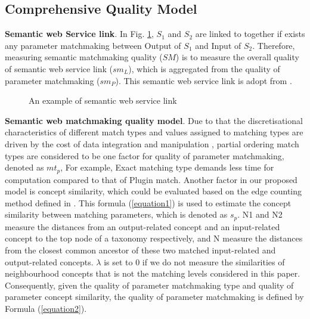 \documentclass{llncs}
\begin{document}
\subsection{Comprehensive Quality Model}\label{qualityModel}

\textbf{Semantic web Service link}. In Fig. \ref{semanticLink}, $S_{1}$ and $S_{2}$ are linked to together if exists any parameter matchmaking between  Output of $S_1$ and Input of $S_2$.  Therefore, measuring semantic matchmaking quality ($SM$) is to measure the overall quality of semantic web service link ($sm_{L}$), which is aggregated from the quality of parameter matchmaking ($sm_{P}$). This semantic web service link is adopt from \cite{lecue2009optimizing}.

\begin{figure}[h]
\centering
{}
 \caption{ An example of semantic web service link}
 \label{semanticLink}
\end{figure}


\textbf{Semantic web matchmaking quality model}. Due to that the discretisational characteristics of different match types and values assigned to matching types are driven by the cost of data integration and manipulation \cite{lecue2009optimizing}, partial ordering match types are considered to be one factor for quality of parameter matchmaking, denoted as $mt_{p}$,  For example, Exact matching type demands less time for computation compared to that of Plugin match. Another factor in our proposed model is concept similarity, which could be evaluated based on the edge counting method defined in \cite{shet2012new}. This formula (\ref{equation1}) is used to estimate the concept similarity between matching parameters, which is denoted as $s_{p}$. N1 and N2 measure the distances from an output-related concept and an input-related concept to the top node of a taxonomy respectively, and N measure the distances from the closest common ancestor of these two matched input-related and output-related concepts. $\lambda$ is set to 0 if we do not measure the similarities of neighbourhood concepts that is not the matching levels considered in this paper. Consequently, given the quality of parameter matchmaking type and quality of parameter concept similarity, the quality of parameter matchmaking is defined by Formula (\ref{equation2}).
\end{document}
